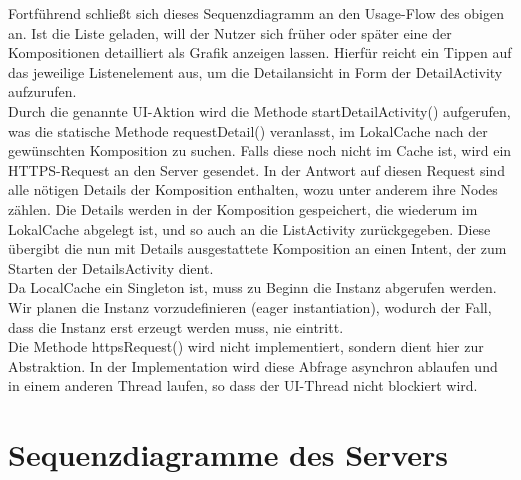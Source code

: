 \noindent Fortführend schließt sich dieses Sequenzdiagramm an den Usage-Flow des obigen an. Ist die Liste geladen, will der Nutzer sich früher oder später eine der Kompositionen  detailliert als Grafik anzeigen lassen. Hierfür reicht ein Tippen auf das jeweilige Listenelement aus, um die Detailansicht in Form der DetailActivity aufzurufen.\newline
\\
Durch die genannte UI-Aktion wird die Methode startDetailActivity() aufgerufen, was die statische Methode requestDetail() veranlasst, im LokalCache nach der gewünschten Komposition zu suchen.
Falls diese noch nicht im Cache ist, wird ein HTTPS-Request an den Server gesendet.
In der Antwort auf diesen Request sind alle nötigen Details der Komposition enthalten, wozu unter anderem ihre Nodes zählen.
Die Details werden in der Komposition gespeichert, die wiederum im LokalCache abgelegt ist, und so auch an die ListActivity zurückgegeben. Diese übergibt die nun mit Details ausgestattete Komposition an einen Intent, der zum Starten der DetailsActivity dient.\newline
\\
Da LocalCache ein Singleton ist, muss zu Beginn die Instanz abgerufen werden. Wir planen die Instanz vorzudefinieren (eager instantiation), wodurch der Fall, dass die Instanz erst erzeugt werden muss, nie eintritt.\newline
\\ \noindent
Die Methode httpsRequest() wird nicht implementiert, sondern dient hier zur Abstraktion. In der Implementation wird diese Abfrage asynchron ablaufen und in einem anderen Thread laufen, so dass der UI-Thread nicht blockiert wird. 


\pagebreak
\section*{Sequenzdiagramme des Servers}


